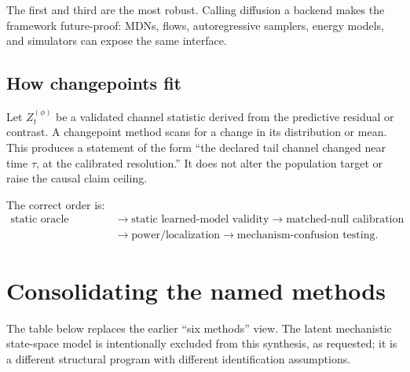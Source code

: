 \documentclass[10pt]{article}
\begin{document}
The first and third are the most robust. Calling diffusion a backend makes the framework future-proof: MDNs, flows, autoregressive samplers, energy models, and simulators can expose the same interface.

\subsection{How changepoints fit}

Let \(Z_t^{(\phi)}\) be a validated channel statistic derived from the predictive residual or contrast. A changepoint method scans for a change in its distribution or mean. This produces a statement of the form ``the declared tail channel changed near time \(\tau\), at the calibrated resolution.'' It does not alter the population target or raise the causal claim ceiling.

The correct order is:
\[
\begin{aligned}
  \text{static oracle validity}
  &\to \text{static learned-model validity}
  \to \text{matched-null calibration}\\
  &\to \text{power/localization}
  \to \text{mechanism-confusion testing}.
\end{aligned}
\]

\section{Consolidating the named methods}

The table below replaces the earlier ``six methods'' view. The latent mechanistic state-space model is intentionally excluded from this synthesis, as requested; it is a different structural program with different identification assumptions.
\end{document}
